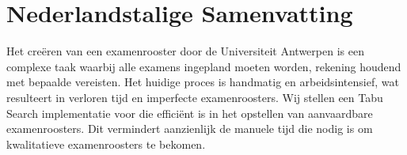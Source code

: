 
\section*{Nederlandstalige Samenvatting}

Het creëren van een examenrooster door de Universiteit Antwerpen is een complexe taak waarbij alle examens ingepland moeten worden, rekening houdend met bepaalde vereisten. Het huidige proces is handmatig en arbeidsintensief, wat resulteert in verloren tijd en imperfecte examenroosters.
Wij stellen een Tabu Search implementatie voor die efficiënt is in het opstellen van aanvaardbare examenroosters. Dit vermindert aanzienlijk de manuele tijd die nodig is om kwalitatieve examenroosters te bekomen.
